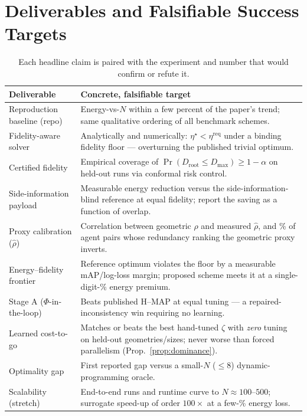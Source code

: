 \documentclass[11pt,a4paper]{article}
\begin{document}
\section{Deliverables and Falsifiable Success Targets}
\label{sec:deliver}
\begin{table}[h]
\centering\footnotesize
\renewcommand{\arraystretch}{1.32}
\begin{tabular}{@{}p{4.4cm} p{10.6cm}@{}}
\toprule
\textbf{Deliverable} & \textbf{Concrete, falsifiable target} \\
\midrule
Reproduction baseline (repo) & Energy-vs-$N$ within a few percent of the paper's trend; same qualitative ordering of all benchmark schemes. \\
Fidelity-aware solver & Analytically and numerically: $\eta^{\star}<\eta^{\mathrm{req}}$ under a binding fidelity floor --- overturning the published trivial optimum. \\
Certified fidelity & Empirical coverage of $\Pr(D_{\mathrm{root}}\le D_{\max})\ge 1-\alpha$ on held-out runs via conformal risk control. \\
Side-information payload & Measurable energy reduction versus the side-information-blind reference at equal fidelity; report the saving as a function of overlap. \\
Proxy calibration ($\hat\rho$) & Correlation between geometric $\rho$ and measured $\hat\rho$, and \% of agent pairs whose redundancy ranking the geometric proxy inverts. \\
Energy--fidelity frontier & Reference optimum violates the floor by a measurable mAP/log-loss margin; proposed scheme meets it at a single-digit-\% energy premium. \\
Stage A ($\Phi$-in-the-loop) & Beats published H--MAP at equal tuning --- a repaired-inconsistency win requiring no learning. \\
Learned cost-to-go & Matches or beats the best hand-tuned $\zeta$ with \emph{zero} tuning on held-out geometries/sizes; never worse than forced parallelism (Prop.~\ref{prop:dominance}). \\
Optimality gap & First reported gap versus a small-$N$ ($\le 8$) dynamic-programming oracle. \\
Scalability (stretch) & End-to-end runs and runtime curve to $N\approx 100$--$500$; surrogate speed-up of order $100\times$ at a few-\% energy loss. \\
\bottomrule
\end{tabular}
\caption{Each headline claim is paired with the experiment and number that would confirm or refute it.}
\label{tab:targets}
\end{table}
\end{document}
